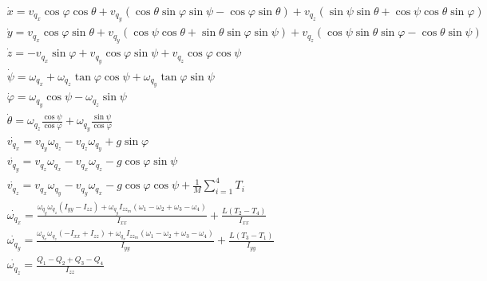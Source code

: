 \documentclass[main]{subfiles}
\begin{document}
\begin{equation}
\boxed{\begin{aligned}&\dot{x}=v_{q_x} \cos \varphi \cos \theta + v_{q_y} ( \cos \theta \sin \varphi \sin \psi-\cos \varphi \sin \theta ) + v_{q_z}(\sin \psi \sin \theta + \cos \psi \cos \theta \sin \varphi)\\
&\dot{y}=v_{q_x} \cos \varphi \sin \theta + v_{q_y} (\cos \psi \cos \theta + \sin \theta \sin \varphi \sin \psi) + v_{q_z}( \cos \psi \sin \theta \sin \varphi-\cos \theta \sin \psi )\\
&\dot{z}= -v_{q_x} \sin \varphi  + v_{q_y} \cos \varphi \sin \psi  + v_{q_z}\cos \varphi \cos \psi\\
&\dot{\psi}=\omega_{q_x} + \omega_{q_z}\tan\varphi \cos\psi + \omega_{q_y}\tan\varphi \sin\psi\\
&\dot{\varphi}=\omega_{q_y}\cos \psi - \omega_{q_z}\sin\psi\\
&\dot{\theta}=\omega_{q_z} \frac{\cos\psi}{\cos\varphi}  + \omega_{q_y}\frac{\sin\psi}{\cos\varphi}\\
&\dot{v_{q_x}}=v_{q_y} \omega_{q_z} - v_{q_z} \omega_{q_y}+g\sin\varphi\\
&\dot{v_{q_y}}=v_{q_z} \omega_{q_x} - v_{q_x} \omega_{q_z}-g\cos\varphi\sin\psi\\
&\dot{v_{q_z}}=v_{q_x} \omega_{q_y} - v_{q_y} \omega_{q_x}-g\cos\varphi\cos\psi+\frac{1}{M}\sum_{i=1}^4T_i\\
&\dot{\omega_{q_x}}=\frac{\omega_{q_y}\omega_{q_z}(I_{yy}-I_{zz})+\omega_{q_y}I_{zz_m}(\omega_1-\omega_2+\omega_3-\omega_4)}{I_{xx}}+\frac{L(T_2-T_4)}{I_{xx}}\\
&\dot{\omega_{q_y}}=\frac{\omega_{q_x}\omega_{q_z}(-I_{xx}+I_{zz})+\omega_{q_x}I_{zz_m}(\omega_1-\omega_2+\omega_3-\omega_4)}{{I_{yy}}}+\frac{L(T_3-T_1)}{I_{yy}}\\
&\dot{\omega_{q_z}}=\frac{Q_1-Q_2+Q_3-Q_4}{I_{zz}}\\
\end{aligned}}
\label{eq:modelo}
\end{equation}
\end{document}
